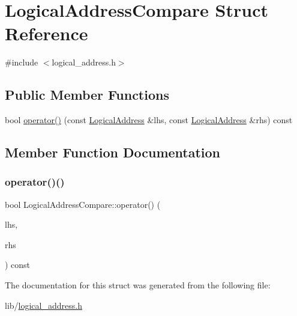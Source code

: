 \hypertarget{structLogicalAddressCompare}{}\section{Logical\+Address\+Compare Struct Reference}
\label{structLogicalAddressCompare}


{\ttfamily \#include $<$logical\+\_\+address.\+h$>$}

\subsection*{Public Member Functions}
\begin{DoxyCompactItemize}
\item 
bool \hyperlink{structLogicalAddressCompare_aa509931ff644dc8f60f77467d7d76a3c}{operator()} (const \hyperlink{structLogicalAddress}{Logical\+Address} \&lhs, const \hyperlink{structLogicalAddress}{Logical\+Address} \&rhs) const
\end{DoxyCompactItemize}


\subsection{Member Function Documentation}
\mbox{\label{structLogicalAddressCompare_aa509931ff644dc8f60f77467d7d76a3c}} 
\subsubsection{\texorpdfstring{operator()()}{operator()()}}
{\footnotesize\ttfamily bool Logical\+Address\+Compare\+::operator() (\begin{DoxyParamCaption}\item[{const \hyperlink{structLogicalAddress}{Logical\+Address} \&}]{lhs,  }\item[{const \hyperlink{structLogicalAddress}{Logical\+Address} \&}]{rhs }\end{DoxyParamCaption}) const\hspace{0.3cm}{\ttfamily [inline]}}



The documentation for this struct was generated from the following file\+:\begin{DoxyCompactItemize}
\item 
lib/\hyperlink{logical__address_8h}{logical\+\_\+address.\+h}\end{DoxyCompactItemize}
